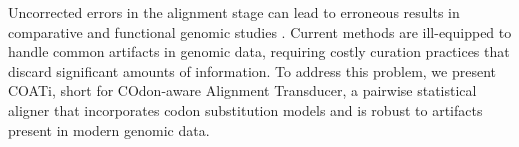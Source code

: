 Uncorrected errors in the alignment stage can lead to erroneous results in comparative and functional genomic studies \parencite{estimates_schneider_2009}.
Current methods are ill-equipped to handle common artifacts in genomic data, requiring costly curation practices that discard significant amounts of information.
To address this problem, we present COATi, short for COdon-aware Alignment Transducer, a pairwise statistical aligner that incorporates codon substitution models and is robust to artifacts present in modern genomic data.

